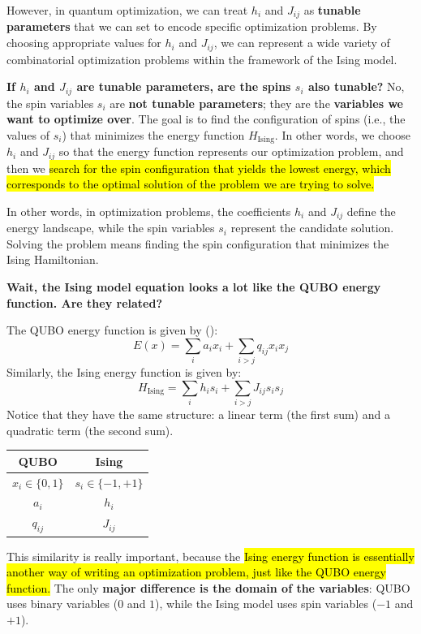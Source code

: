 \highspace
However, in quantum optimization, we can treat $h_i$ and $J_{ij}$ as \textbf{tunable parameters} that we can set to encode specific optimization problems. By choosing appropriate values for $h_i$ and $J_{ij}$, we can represent a wide variety of combinatorial optimization problems within the framework of the Ising model.

\highspace
\textcolor{Green3}{ \textbf{If $h_i$ and $J_{ij}$ are tunable parameters, are the spins $s_i$ also tunable?}} No, the spin variables $s_i$ are \textbf{not tunable parameters}; they are the \textbf{variables we want to optimize over}. The goal is to find the configuration of spins (i.e., the values of $s_i$) that minimizes the energy function $H_{\text{Ising}}$. In other words, we choose $h_i$ and $J_{ij}$ so that the energy function represents our optimization problem, and then we \hl{search for the spin configuration that yields the lowest energy, which corresponds to the optimal solution of the problem we are trying to solve.}

\highspace
In other words, in optimization problems, the coefficients $h_i$ and $J_{ij}$ define the energy landscape, while the spin variables $s_i$ represent the candidate solution. Solving the problem means finding the spin configuration that minimizes the Ising Hamiltonian.

\highspace
\begin{flushleft}
    \textcolor{Green3}{ \textbf{Wait, the Ising model equation looks a lot like the QUBO energy function. Are they related?}}
\end{flushleft}
The QUBO energy function is given by ():
\begin{equation*}
    E(x) = \sum_i a_i x_i + \sum_{i>j} q_{ij} x_i x_j
\end{equation*}
Similarly, the Ising energy function is given by:
\begin{equation*}
    H_{\text{Ising}} = \sum_i h_i s_i + \sum_{i>j} J_{ij} s_i s_j
\end{equation*}
Notice that they have the same structure: a linear term (the first sum) and a quadratic term (the second sum).
\begin{center}
    \begin{tabular}{@{} c c @{}}
        \toprule
        \textbf{QUBO} & \textbf{Ising} \\
        \midrule
        $x_i \in \{0,1\}$ & $s_i \in \{-1,+1\}$ \\
        $a_i$ & $h_i$ \\
        $q_{ij}$ & $J_{ij}$ \\
        \bottomrule
    \end{tabular}
\end{center}

\noindent
This similarity is really important, because the \hl{Ising energy function is essentially another way of writing an optimization problem, just like the QUBO energy function.} The only \textbf{major difference is the domain of the variables}: QUBO uses binary variables ($0$ and $1$), while the Ising model uses spin variables ($-1$ and $+1$).